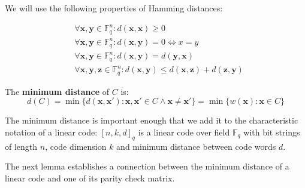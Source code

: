 We will use the following properties of Hamming distances:


\begin{lem}\label{hammingtriangle}
\begin{align*}
&\forall \bm{x}, \bm{y} \in \mathbb{F}_q^n : d(\bm{x}, \bm{x}) \geq 0 \\
&\forall \bm{x}, \bm{y} \in \mathbb{F}_q^n : d(\bm{x}, \bm{y}) = 0 \Leftrightarrow x = y \\
&\forall \bm{x}, \bm{y} \in \mathbb{F}_q^n : d(\bm{x}, \bm{y}) = d(\bm{y}, \bm{x}) \\
&\forall \bm{x}, \bm{y}, \bm{z} \in \mathbb{F}_q^n : d(\bm{x}, \bm{y}) \leq d(\bm{x}, \bm{z}) + d(\bm{z}, \bm{y})
\end{align*}
\end{lem}

\begin{defn}\label{hammingDistCodeDef}
The \textbf{minimum distance} of $C$ is:
$$
d(C) = \min \{d(\bm{x}, \bm{x'}) : \bm{x}, \bm{x'} \in C \land \bm{x} \neq \bm{x'} \} = \min \{w(\bm{x}) : \bm{x} \in C \}
$$
\end{defn}

The minimum distance is important enough that we add it to the characteristic notation of a linear code: $[n, k, d]_q$ is a linear  code over field $\mathbb{F}_q$ with bit strings of length $n$, code dimension $k$ and minimum distance between code words $d$.

The next lemma establishes a connection between the minimum distance of a linear code and one of its parity check matrix.

